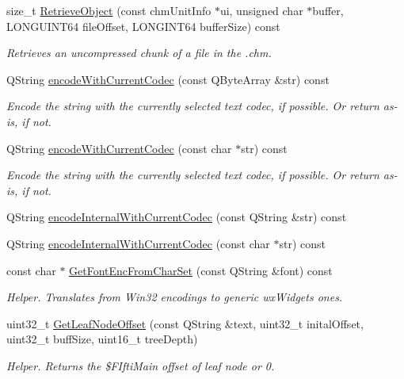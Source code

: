 \begin{DoxyCompactItemize}
size\+\_\+t \hyperlink{classLCHMFileImpl_a8535dce5eb8f22161ecf3510fde8aa4e}{Retrieve\+Object} (const chm\+Unit\+Info $\ast$ui, unsigned char $\ast$buffer, L\+O\+N\+G\+U\+I\+N\+T64 file\+Offset, L\+O\+N\+G\+I\+N\+T64 buffer\+Size) const 
\begin{DoxyCompactList}\small\item\em Retrieves an uncompressed chunk of a file in the .chm. \end{DoxyCompactList}\item 
Q\+String \hyperlink{classLCHMFileImpl_a6f8c407b1fbbe568df1690b3d2edee91}{encode\+With\+Current\+Codec} (const Q\+Byte\+Array \&str) const 
\begin{DoxyCompactList}\small\item\em Encode the string with the currently selected text codec, if possible. Or return as-\/is, if not. \end{DoxyCompactList}\item 
Q\+String \hyperlink{classLCHMFileImpl_affe0747c6bda7fda43b83990b98b7a43}{encode\+With\+Current\+Codec} (const char $\ast$str) const 
\begin{DoxyCompactList}\small\item\em Encode the string with the currently selected text codec, if possible. Or return as-\/is, if not. \end{DoxyCompactList}\item 
Q\+String \hyperlink{classLCHMFileImpl_a8ce5f30817fc625ec4f790817db9871c}{encode\+Internal\+With\+Current\+Codec} (const Q\+String \&str) const 
\item 
Q\+String \hyperlink{classLCHMFileImpl_ab451208cae4f7b2b47eb703b3ae43820}{encode\+Internal\+With\+Current\+Codec} (const char $\ast$str) const 
\item 
const char $\ast$ \hyperlink{classLCHMFileImpl_a36a8e34fa0b5fd85f1118c50b4e192af}{Get\+Font\+Enc\+From\+Char\+Set} (const Q\+String \&font) const 
\begin{DoxyCompactList}\small\item\em Helper. Translates from Win32 encodings to generic wx\+Widgets ones. \end{DoxyCompactList}\item 
uint32\+\_\+t \hyperlink{classLCHMFileImpl_accf081c4ea0e7ec303b969d53d82593a}{Get\+Leaf\+Node\+Offset} (const Q\+String \&text, uint32\+\_\+t inital\+Offset, uint32\+\_\+t buff\+Size, uint16\+\_\+t tree\+Depth)
\begin{DoxyCompactList}\small\item\em Helper. Returns the \$\+F\+Ifti\+Main offset of leaf node or 0. \end{DoxyCompactList}\item 

\end{DoxyCompactItemize}
